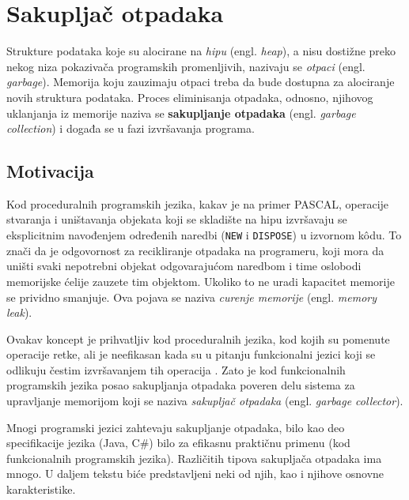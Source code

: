 \section{Sakupljač otpadaka}
\label{sec:djubretar}


Strukture podataka koje su alocirane na \textit{hipu} (engl. \textit{heap}), a nisu dostižne preko nekog niza pokazivača programskih promenljivih, nazivaju se \textit{otpaci} (engl. \textit{garbage}). Memorija koju zauzimaju otpaci treba da bude dostupna za alociranje novih struktura podataka. Proces eliminisanja otpadaka, odnosno, njihovog uklanjanja iz memorije naziva se \textbf{sakupljanje otpadaka} (engl. \textit{garbage collection}) i događa se u fazi izvršavanja programa.

\subsection{Motivacija}

Kod proceduralnih programskih jezika, kakav je na primer PASCAL, operacije stvaranja i uništavanja objekata koji se skladište na hipu izvršavaju se eksplicitnim navođenjem određenih naredbi (\verb|NEW| i \verb|DISPOSE|) u izvornom k\^odu. To znači da je odgovornost za recikliranje otpadaka na programeru, koji mora da uništi svaki nepotrebni objekat odgovarajućom naredbom i time oslobodi memorijske ćelije zauzete tim objektom. Ukoliko to ne uradi kapacitet memorije se prividno smanjuje. Ova pojava se naziva \textit{curenje memorije} (engl. \textit{memory leak}).

Ovakav koncept je prihvatljiv kod proceduralnih jezika, kod kojih su pomenute operacije retke, ali je neefikasan kada su u pitanju funkcionalni jezici koji se odlikuju čestim izvršavanjem tih operacija \cite{appel}. Zato je kod funkcionalnih programskih jezika posao sakupljanja otpadaka poveren delu sistema za upravljanje memorijom koji se naziva \textit{sakupljač otpadaka} (engl. \textit{garbage collector}).

Mnogi programski jezici zahtevaju sakupljanje otpadaka, bilo kao deo specifikacije jezika (Java, C\#) bilo za efikasnu praktičnu primenu (kod funkcionalnih programskih jezika). Različitih tipova sakupljača otpadaka ima mnogo. U daljem tekstu biće predstavljeni neki od njih, kao i njihove osnovne karakteristike.

